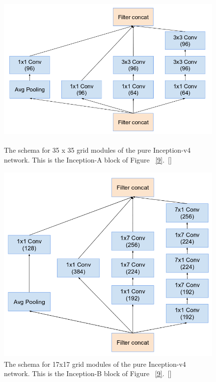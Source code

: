 \documentclass[a4paper,12pt, twoside]{NITKReport}
\begin{document}
\begin{figure}[h]
\centering

    \includegraphics[height=8cm,width=15cm]{figure4.png}
    \caption{The  schema  for 35 x 35 grid  modules of the pure Inception-v4 network. This is the Inception-A block of Figure ~\ref{9}.~[\cite{szegedy2017inception}]}
    \label{4}
  
\end{figure}



\begin{figure}[h]
  \centering
  
    \includegraphics[height=10cm,width=15cm]{figure5.png}
    \caption{The  schema  for 17x17 grid  modules  of  the  pure Inception-v4 network. This is the Inception-B block of Figure ~\ref{9}.~[\cite{szegedy2017inception}]}
    \label{5}
 
 \end{figure}
 
\end{document}
